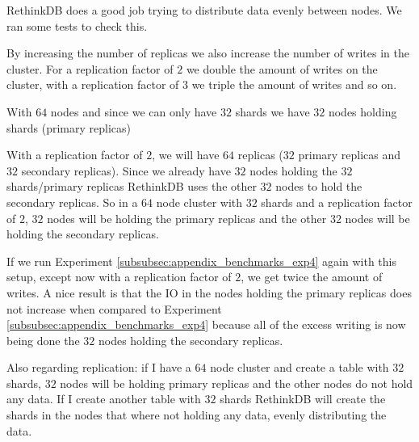 RethinkDB does a good job trying to distribute data evenly between nodes.
We ran some tests to check this.

By increasing the number of replicas we also increase the number of writes in the cluster.
For a replication factor of $2$ we double the amount of writes on the cluster, with a replication factor of $3$ we triple the amount of writes and so on.

With $64$ nodes and since we can only have $32$ shards we have $32$ nodes holding shards (primary replicas)

With a replication factor of $2$, we will have $64$ replicas ($32$ primary replicas and $32$ secondary replicas).
Since we already have $32$ nodes holding the $32$ shards/primary replicas RethinkDB uses the other $32$ nodes to hold the secondary replicas. 
So in a $64$ node cluster with $32$ shards and a replication factor of $2$, $32$ nodes will be holding the primary replicas and the other $32$ nodes will be holding the secondary replicas.

If we run Experiment \ref{subsubsec:appendix_benchmarks_exp4} again with this setup, except now with a replication factor of $2$, we get twice the amount of writes. 
A nice result is that the IO in the nodes holding the primary replicas does not increase when compared to Experiment \ref{subsubsec:appendix_benchmarks_exp4} because all of the excess writing is now being done the $32$ nodes holding the secondary replicas.

Also regarding replication: if I have a $64$ node cluster and create a table with $32$ shards, $32$ nodes will be holding primary replicas and the other nodes do not hold any data. 
If I create another table with $32$ shards RethinkDB will create the shards in the nodes that where not holding any data, evenly distributing the data.

